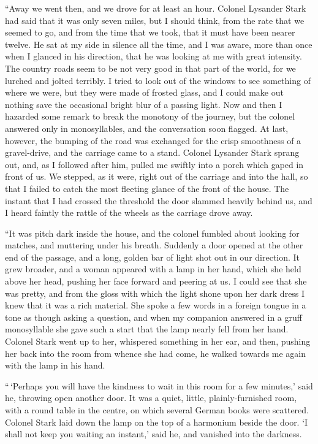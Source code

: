 “Away we went then, and we drove for at least an hour.
Colonel Lysander Stark had said that it was only seven miles,
but I should think, from the rate that we seemed to go, and
from the time that we took, that it must have been nearer
twelve. He sat at my side in silence all the time, and I was
aware, more than once when I glanced in his direction, that
he was looking at me with great intensity. The country roads
seem to be not very good in that part of the world, for we
lurched and jolted terribly. I tried to look out of the windows
to see something of where we were, but they were made
of frosted glass, and I could make out nothing save the occasional
bright blur of a passing light. Now and then I hazarded
some remark to break the monotony of the journey,
but the colonel answered only in monosyllables, and the conversation
soon flagged. At last, however, the bumping of the
road was exchanged for the crisp smoothness of a gravel-drive,
and the carriage came to a stand. Colonel Lysander
Stark sprang out, and, as I followed after him, pulled me
swiftly into a porch which gaped in front of us. We stepped,
as it were, right out of the carriage and into the hall, so
that I failed to catch the most fleeting glance of the front of
the house. The instant that I had crossed the threshold the
door slammed heavily behind us, and I heard faintly the rattle
of the wheels as the carriage drove away.

“It was pitch dark inside the house, and the colonel fumbled
about looking for matches, and muttering under his
breath. Suddenly a door opened at the other end of the
passage, and a long, golden bar of light shot out in our direction.
It grew broader, and a woman appeared with a lamp in
her hand, which she held above her head, pushing her face
forward and peering at us. I could see that she was pretty,
and from the gloss with which the light shone upon her dark
dress I knew that it was a rich material. She spoke a few
words in a foreign tongue in a tone as though asking a question,
and when my companion answered in a gruff monosyllable
she gave such a start that the lamp nearly fell from her
hand. Colonel Stark went up to her, whispered something in
her ear, and then, pushing her back into the room from whence
she had come, he walked towards me again with the lamp in
his hand.

“\,‘Perhaps you will have the kindness to wait in this room
for a few minutes,’ said he, throwing open another door. It
was a quiet, little, plainly-furnished room, with a round table
in the centre, on which several German books were scattered.
Colonel Stark laid down the lamp on the top of a harmonium
beside the door. ‘I shall not keep you waiting an instant,’
said he, and vanished into the darkness.

